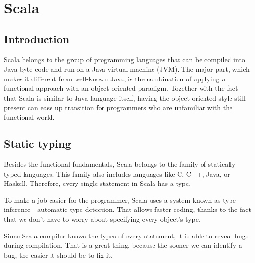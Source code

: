 \section{Scala}
\subsection{Introduction}
Scala belongs to the group of programming languages that can be compiled into Java byte code and run on a Java virtual machine (JVM). The major part, which makes it different from well-known Java, is the combination of applying a functional approach with an object-oriented paradigm. Together with the fact that Scala is similar to Java language itself, having the object-oriented style still present can ease up transition for programmers who are unfamiliar with the functional world.

\subsection{Static typing}

Besides the functional fundamentals, Scala belongs to the family of statically typed languages. This family also includes languages like C, C++, Java, or Haskell. Therefore, every single statement in Scala has a type.\cite{Scala static}

To make a job easier for the programmer, Scala uses a system known as type inference - automatic type detection. That allows faster coding, thanks to the fact that we don’t have to worry about specifying every object’s type. 

Since Scala compiler knows the types of every statement, it is able to reveal bugs during compilation. That is a great thing, because the sooner we can identify a bug, the easier it should be to fix it. 
